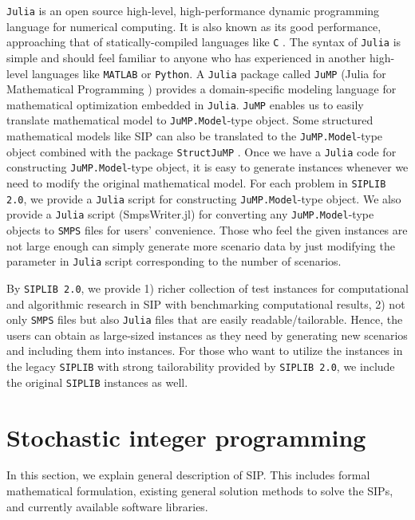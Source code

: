 \texttt{Julia} is an open source high-level, high-performance dynamic programming language for numerical computing. It is also known as its good performance, approaching that of statically-compiled languages like \texttt{C} \cite{journal:BEKS2017}. The syntax of \texttt{Julia} is simple and should feel familiar to anyone who has experienced in another high-level languages like \texttt{MATLAB} or \texttt{Python}. A \texttt{Julia} package called \texttt{JuMP} (Julia for Mathematical Programming \cite{web:JuMP}) provides a domain-specific modeling language for mathematical optimization embedded in \texttt{Julia}. \texttt{JuMP} enables us to easily translate mathematical model to \texttt{JuMP.Model}-type object. Some structured mathematical models like SIP can also be translated to the \texttt{JuMP.Model}-type object combined with the package \texttt{StructJuMP} \cite{web:StructJuMP}. Once we have a \texttt{Julia} code for constructing \texttt{JuMP.Model}-type object, it is easy to generate instances whenever we need to modify the original mathematical model. For each problem in \texttt{SIPLIB 2.0}, we provide a \texttt{Julia} script for constructing \texttt{JuMP.Model}-type object. We also provide a \texttt{Julia} script (SmpsWriter.jl) for converting any \texttt{JuMP.Model}-type objects to \texttt{SMPS} files for users' convenience. Those who feel the given instances are not large enough can simply generate more scenario data by just modifying the parameter in \texttt{Julia} script corresponding to the number of scenarios.

By \texttt{SIPLIB 2.0}, we provide 1) richer collection of test instances for computational and algorithmic research in SIP with benchmarking computational results, 2) not only \texttt{SMPS} files but also \texttt{Julia} files that are easily readable/tailorable. Hence, the users can obtain as large-sized instances as they need by generating new scenarios and including them into instances. For those who want to utilize the instances in the legacy \texttt{SIPLIB} with strong tailorability provided by \texttt{SIPLIB 2.0}, we include the original \texttt{SIPLIB} instances as well.

\section{Stochastic integer programming} \label{sec:SIP}
In this section, we explain general description of SIP. This includes formal mathematical formulation, existing general solution methods to solve the SIPs, and currently available software libraries.
